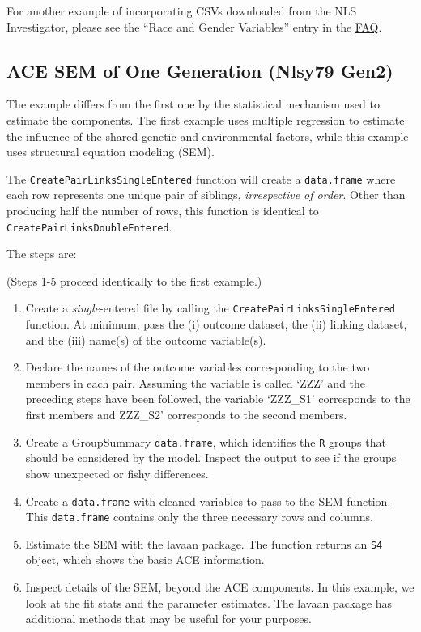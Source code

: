 \documentclass[smallextended]{svjour3}       %
\providecommand{\tightlist}{%
  \setlength{\itemsep}{0pt}\setlength{\parskip}{0pt}}
\begin{document}
For another example of incorporating CSVs downloaded from the NLS
Investigator, please see the ``Race and Gender Variables'' entry in the
\href{https://nlsy-links.github.io/NlsyLinks/articles/faq.html}{FAQ}.

\hypertarget{ace-sem-of-one-generation-nlsy79-gen2}{%
\subsection{ACE SEM of One Generation (Nlsy79
Gen2)}\label{ace-sem-of-one-generation-nlsy79-gen2}}

The example differs from the first one by the statistical mechanism used
to estimate the components. The first example uses multiple regression
to estimate the influence of the shared genetic and environmental
factors, while this example uses structural equation modeling (SEM).

The \texttt{CreatePairLinksSingleEntered} function will create a
\texttt{data.frame} where each row represents one unique pair of
siblings, \emph{irrespective of order}. Other than producing half the
number of rows, this function is identical to
\texttt{CreatePairLinksDoubleEntered}.

The steps are:

(Steps 1-5 proceed identically to the first example.)

\begin{enumerate}
\def\labelenumi{\arabic{enumi}.}
\setcounter{enumi}{5}
\tightlist
\item
  Create a \emph{single}-entered file by calling the
  \texttt{CreatePairLinksSingleEntered} function. At minimum, pass the
  (i) outcome dataset, the (ii) linking dataset, and the (iii) name(s)
  of the outcome variable(s).
\item
  Declare the names of the outcome variables corresponding to the two
  members in each pair. Assuming the variable is called `ZZZ' and the
  preceding steps have been followed, the variable `ZZZ\_S1' corresponds
  to the first members and ZZZ\_S2' corresponds to the second members.
\item
  Create a GroupSummary \texttt{data.frame}, which identifies the
  \texttt{R} groups that should be considered by the model. Inspect the
  output to see if the groups show unexpected or fishy differences.
\item
  Create a \texttt{data.frame} with cleaned variables to pass to the SEM
  function. This \texttt{data.frame} contains only the three necessary
  rows and columns.
\item
  Estimate the SEM with the lavaan package. The function returns an
  \texttt{S4} object, which shows the basic ACE information.
\item
  Inspect details of the SEM, beyond the ACE components. In this
  example, we look at the fit stats and the parameter estimates. The
  lavaan package has additional methods that may be useful for your
  purposes.
\end{enumerate}
\end{document}
